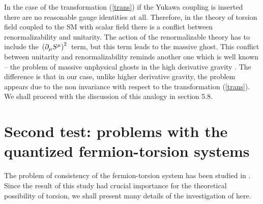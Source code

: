 In the case of the transformation (\ref{trans})
if the Yukawa coupling is inserted there are no reasonable gauge
identities at all. Therefore, in the theory of torsion field coupled
to the SM with scalar field there is a conflict between
renormalizability and unitarity. The action of the renormalizable
theory has to include the $\,\left(\partial_\mu S^\mu\right)^2\,$ term,
but this term leads to the massive ghost.
This conflict between unitarity and renormalizability reminds 
another
one which is well known -- the problem of massive unphysical ghosts
in the high derivative gravity \cite{stelle}. The difference is that 
in our case, unlike higher derivative gravity,
the problem appears due to the non invariance with respect
to the transformation (\ref{trans}). We shall proceed with the
discussion of this analogy in section 5.8.

\section{Second test: problems with the quantized
fermion-torsion systems}

The problem of consistency of the fermion-torsion system has been 
studied in \cite{guhesh}. Since the result of this study had crucial 
importance for the theoretical possibility of torsion, we shall 
present many details of the investigation of \cite{guhesh} here. 

